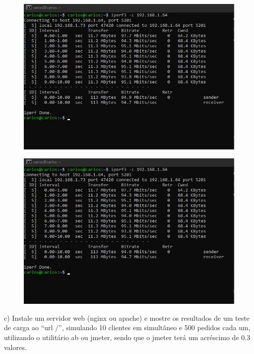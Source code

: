 \documentclass{article}
\begin{document}
	\begin{figure}[!htb]
		\centering
		\includegraphics[scale=0.6]{tp_sosd_b1.1}
	\end{figure}
	\vspace{2 em}
	\begin{figure}[!htb]
		\centering
		\includegraphics[scale=0.6]{tp_sosd_b1.1}
	\end{figure}
	
	\newpage
	c) Instale um servidor web (nginx ou apache) e mostre os resultados de um teste
	de carga ao “url /”, simulando 10 clientes em simultâneo e 500 pedidos cada
	um, utilizando o utilitário ab ou jmeter, sendo que o jmeter terá um acréscimo
	de 0.3 valores.
	\vspace{2 em}
	
\end{document}
